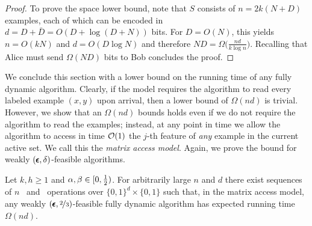 \begin{proof}
To prove the space lower bound, note that $S$ consists of $n=2k(N+D)$ examples, each of which can be encoded in $d=D+\bar D = O(D + \log(D+N))$ bits. For $D = O(N)$, this yields $n=O(kN)$ and $d=O(D \log N)$ and therefore $ND = \Omega\big(\frac{nd}{k\log n}\big)$. Recalling that Alice must send $\Omega(ND)$ bits to Bob concludes the proof.
\end{proof}

We conclude this section with a lower bound on the running time of any fully dynamic algorithm. Clearly, if the model requires the algorithm to read every labeled example $(x,y)$ upon arrival, then a lower bound of $\Omega(nd)$ is trivial. However, we show that an $\Omega(nd)$ bounds holds even if we do not require the algorithm to read the examples; instead, at any point in time we allow the algorithm  to access in time $\mathcal{O}(1)$ the $j$-th feature of \emph{any} example in the current active set. We call this the \emph{matrix access model}. Again, we prove the bound for weakly $(\pmb{\epsilon},\delta)$-feasible algorithms.
\begin{theorem}\label{thm:time_lb}
Let $k,h \ge 1$ and $\alpha,\beta\in [0, \frac{1}{2})$. For arbitrarily large $n$ and $d$ there exist sequences of $n$ \ins\ and \del\ operations over $\{0,1\}^d \times \{0,1\}$ such that, in the matrix access model, any weakly $(\pmb{\epsilon},\nicefrac{2}{3})$-feasible fully dynamic algorithm has expected running time $\Omega(nd)$.
\end{theorem}

%

